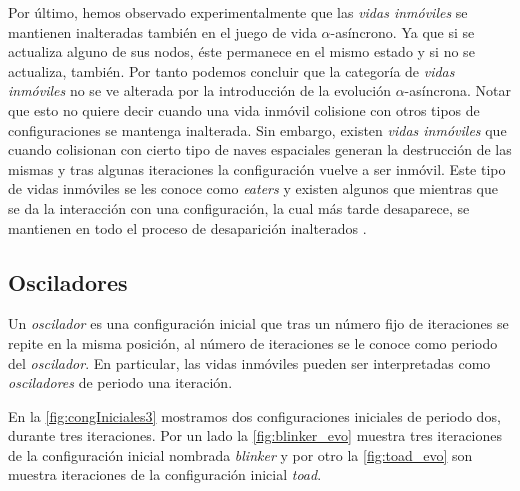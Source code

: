 \documentclass[../proyecto.tex]{memoir}
\begin{document}
Por último, hemos observado experimentalmente que las \textit{vidas inmóviles} se mantienen inalteradas también en el juego de vida $\alpha$-asíncrono. Ya que si se actualiza alguno de sus nodos, éste permanece en el mismo estado y si no se actualiza, también. Por tanto podemos concluir que la categoría de \textit{vidas inmóviles} no se ve alterada por la introducción de la evolución $\alpha$-asíncrona. Notar que esto no quiere decir cuando una vida inmóvil colisione con otros tipos de configuraciones se mantenga inalterada. Sin embargo, existen \textit{vidas inmóviles} que cuando colisionan con cierto tipo de naves espaciales generan la destrucción de las mismas y tras algunas iteraciones la configuración vuelve a ser inmóvil. Este tipo de vidas inmóviles se les conoce como \textit{eaters} y existen algunos que mientras que se da la interacción con una configuración, la cual más tarde desaparece, se mantienen en todo el proceso de desaparición inalterados \cite{eater}. 

\subsection{Osciladores}

Un \textit{oscilador} es una configuración inicial que tras un número fijo de iteraciones se repite en la misma posición, al número de iteraciones se le conoce como periodo del \textit{oscilador}. En particular, las vidas inmóviles pueden ser interpretadas como \textit{osciladores} de periodo una iteración.

En la \autoref{fig:congIniciales3} mostramos dos configuraciones iniciales de periodo dos, durante tres iteraciones. Por un lado la \autoref{fig:blinker_evo} muestra tres iteraciones de la configuración inicial nombrada \textit{blinker} y por otro la \autoref{fig:toad_evo} son muestra iteraciones de la configuración inicial \textit{toad}.
\end{document}
